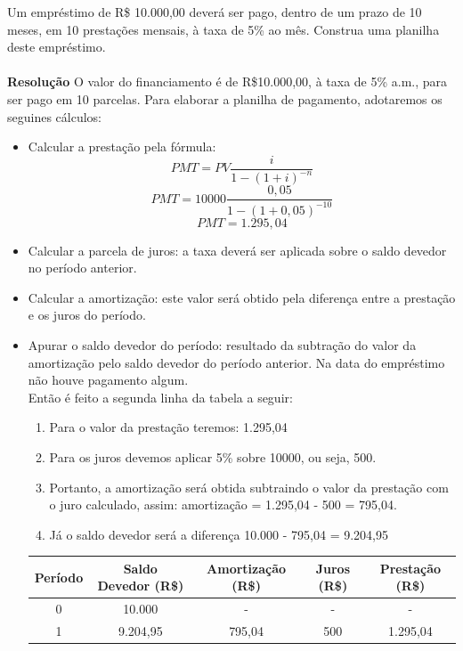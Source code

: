 \documentclass[a4paper, 12pt]{article}
\begin{document}
Um empréstimo de R\$ 10.000,00 deverá ser pago, dentro de um prazo de 10 meses, em 10 prestações mensais, à taxa de 5\% ao mês. Construa uma planilha deste empréstimo.\\\\
\textbf{Resolução}
O valor do financiamento é de R\$10.000,00, à taxa de 5\% a.m., para ser pago em 10 parcelas. Para elaborar a planilha de pagamento, adotaremos os seguines cálculos:\\
\begin{itemize}
\item Calcular a prestação pela fórmula:\\
  $$ PMT = PV\frac{i}{1-(1+i)^{-n}} $$
  $$ PMT = 10000\frac{0,05}{1-(1+0,05)^{-10}} $$
  $$ \boxed{PMT = 1.295,04} $$    
\item Calcular a parcela de juros: a taxa deverá ser aplicada sobre o saldo devedor no período anterior.
\item Calcular a amortização: este valor será obtido pela diferença entre a prestação e os juros do período.
\item Apurar o saldo devedor do período: resultado da subtração do valor da amortização pelo saldo devedor do período anterior. Na data do empréstimo não houve pagamento algum.\\

  Então é feito a segunda linha da tabela a seguir:
  \begin{enumerate}
    \item Para o valor da prestação teremos: 1.295,04
    \item Para os juros devemos aplicar 5\% sobre 10000, ou seja, 500.
    \item Portanto, a amortização será obtida subtraindo o valor da prestação com o juro calculado, assim: amortização = 1.295,04 - 500 = 795,04.
    \item Já o saldo devedor será a diferença 10.000 - 795,04 = 9.204,95
  \end{enumerate}  

  \begin{tabular}{ | c | c | c | c | c |}
  \hline
  Período & Saldo Devedor (R\$) & Amortização (R\$) & Juros (R\$) & Prestação (R\$) \\ \hline
  0 & 10.000 & - & - & - \\ \hline
  1 & 9.204,95 & 795,04 & 500 & 1.295,04 \\ \hline
  \end{tabular} \\\\
  

\end{itemize}
\end{document}
